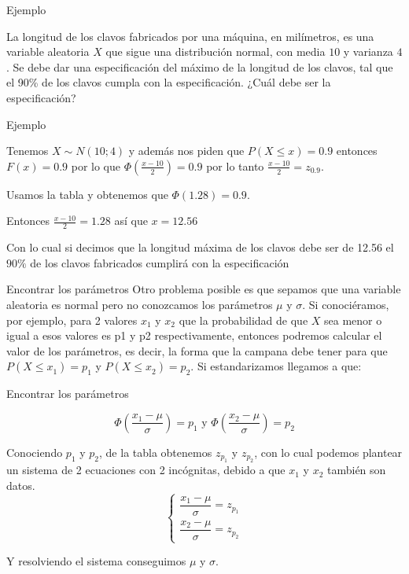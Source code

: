 \documentclass[11pt]{beamer}
\begin{document}
\begin{frame}{Ejemplo}

La longitud de los clavos fabricados por una m\'aquina, en mil\'imetros, es una variable aleatoria $X$ que sigue una distribuci\'on normal, con media $10$ y varianza $4$. Se debe dar una especificaci\'on del m\'aximo de  la longitud de los clavos, tal que el 90\% de los clavos cumpla con la especificaci\'on. ¿Cu\'al debe ser la especificaci\'on?

\end{frame}

\begin{frame}{Ejemplo}

Tenemos $X\sim N(10;4)$ y adem\'as nos piden que $P\left( X\le x \right)=0.9$ entonces  $F(x)=0.9$
por lo que $\Phi (\frac{x-10}{2})=0.9$ por lo tanto $\frac{x-10}{2}=z_{0.9}$.

\bigskip
Usamos la tabla y obtenemos que
$\Phi (1.28)=0.9$.

\bigskip
 Entonces $\frac{x-10}{2}=1.28$ así que $x=12.56$

\bigskip
Con lo cual si decimos que la longitud m\'axima de los clavos debe ser de 12.56 el $90\%$ de los clavos fabricados cumplir\'a con la especificaci\'on
\end{frame}

\begin{frame}{Encontrar los par\'ametros}
Otro problema posible es que sepamos que una variable aleatoria es normal pero no conozcamos los par\'ametros $\mu$ y $\sigma$. Si conoci\'eramos, por ejemplo, para 2 valores $x_1$ y $x_2$ que la probabilidad de que $X$ sea menor o igual a esos valores es p1 y p2 respectivamente, entonces podremos calcular el valor de los par\'ametros, es decir, la forma que la campana debe tener para que $P(X{ \le x }_{ 1 })={ p }_{ 1 }$ y $P(X{ \le x }_{ 2 })={ p }_{ 2 } $. Si estandarizamos llegamos a que:
\end{frame}

\begin{frame}{Encontrar los par\'ametros}

$$\Phi \left(\frac{x_1 -\mu}{\sigma}\right) =p_1 \mbox{ y } \Phi \left(\frac{x_2 -\mu}{\sigma} \right) =p_2$$

Conociendo $ { p }_{ 1 }$ y ${ p }_{ 2 } $, de la tabla obtenemos ${ z }_{ p_1 } $ y ${ z }_{ p_2 } $, con lo cual podemos plantear un sistema de 2 ecuaciones con 2 inc\'ognitas, debido a que $ { x }_{ 1 }$ y $ { x }_{ 2 }$ tambi\'en son datos.
$$\left\{\begin{matrix}
\dfrac{x_1 -\mu}{\sigma}=z_{p_1}\\ 
\dfrac{x_2 -\mu}{\sigma}=z_{p_2}
\end{matrix}\right.$$

Y resolviendo el sistema conseguimos $\mu $ y $\sigma $.
\end{frame}
\end{document}
